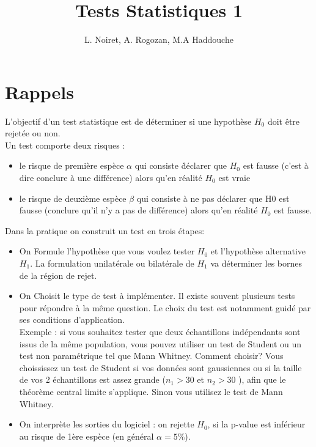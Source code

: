 \documentclass[11pt,a4paper]{article}
\begin{document}
				
				
				
				
				\title{\vspace*{-2cm}
					\large Tests Statistiques 1}
				\author{L. Noiret, A. Rogozan, M.A Haddouche} 
				\date{ }
				
				\maketitle
			
			
				
				
			
				\section*{Rappels}	
				L'objectif d'un test statistique est de d\'eterminer si une hypoth\`ese $H_0$ doit \^etre rejet\'ee ou non. \\
				Un test comporte deux risques :
				\begin{itemize}
					\item le risque de premi\`ere esp\`ece $\alpha$ qui consiste \` d\'eclarer que $H_0$ est fausse (c'est \`a dire conclure \`a une diff\'erence) alors qu'en r\'ealit\'e $H_0$ est vraie
					\item le risque de deuxi\`eme esp\`ece $\beta$ qui consiste \`a ne pas d\'eclarer que H0 est fausse (conclure qu'il n'y a pas de diff\'erence) alors qu'en r\'ealit\'e $H_0$ est fausse.  
				\end{itemize}
			Dans la pratique  on construit un test en trois étapes: 
				\begin{itemize}
					\item On Formule l'hypoth\`ese que vous voulez tester $H_0$ et l'hypoth\`ese alternative $H_1$. La formulation  unilat\'erale ou bilat\'erale de $H_1$ va d\'eterminer les bornes de la r\'egion de rejet. 
%					
					\item On Choisit le type de test \`a impl\'ementer. Il existe souvent plusieurs tests pour r\'epondre \`a la m\^eme question. Le choix du test est notamment guid\'e par ses conditions d'application.\\ Exemple : si vous souhaitez tester que deux \'echantillons ind\'ependants sont issus de la m\^eme population, vous pouvez utiliser un test de Student  ou un test non param\'etrique tel que Mann Whitney. Comment choisir?
					Vous choississez un test de Student si vos donn\'ees sont gaussiennes ou si la taille de vos 2 \'echantillons est assez grande ($n_1>30$ et $n_2>30$ ), afin que le th\'eor\`eme central limite s'applique. Sinon vous utilisez le test de Mann Whitney.
%					
				\item On interprète les sorties du logiciel : on rejette $H_0$, si la p-value est inf\'erieur au risque de 1\`ere esp\`ece (en g\'en\'eral $\alpha=5\%$). 
					
				\end{itemize}
			
\end{document}

